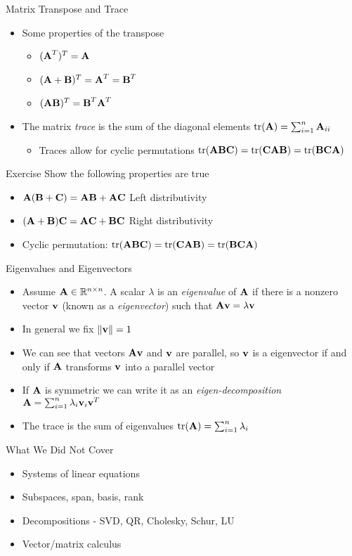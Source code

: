 \documentclass{beamer}
\begin{document}
\begin{frame}{Matrix Transpose and Trace} 
 \begin{itemize} 
  \item Some properties of the transpose  
  \begin{itemize}
  \item $(\textbf{A}^T)^T = \textbf{A}$ 
  \item $(\textbf{A} + \textbf{B})^T = \textbf{A}^T = \textbf{B}^T$ 
  \item $(\textbf{A}\textbf{B})^T = \textbf{B}^T\textbf{A}^T$  
  \end{itemize} 
 \item The matrix \emph{trace} is the sum of the diagonal elements $\mbox{tr}(\textbf{A}) = \sum_{i=1}^n \textbf{A}_{ii}$ 
 \begin{itemize} 
 \item Traces allow for cyclic permutations $\mbox{tr}(\textbf{A}\textbf{B}\textbf{C}) = \mbox{tr}(\textbf{C}\textbf{A}\textbf{B}) = \mbox{tr}(\textbf{B}\textbf{C}\textbf{A})$ 
 \end{itemize}
 \end{itemize}
\end{frame}

\begin{frame}{Exercise} 
Show the following properties are true
\begin{itemize}
 \item $\textbf{A}(\textbf{B} + \textbf{C}) = \textbf{A}\textbf{B} + \textbf{A}\textbf{C}$ Left distributivity 
 \item $(\textbf{A} +\textbf{B}) \textbf{C} = \textbf{A}\textbf{C} +\textbf{B}\textbf{C}$ Right distributivity 
 \item Cyclic permutation: $\mbox{tr}(\textbf{A}\textbf{B}\textbf{C}) = \mbox{tr}(\textbf{C}\textbf{A}\textbf{B}) = \mbox{tr}(\textbf{B}\textbf{C}\textbf{A})$ 
\end{itemize}
\end{frame}

\begin{frame}{Eigenvalues and Eigenvectors}  
\begin{itemize} 
 \item Assume $\textbf{A} \in \mathbb{R}^{n \times n}$. A scalar $\lambda$ is an \emph{eigenvalue} of $\textbf{A}$ if there is a nonzero vector $\textbf{v}$ (known as a \emph{eigenvector}) such that $\textbf{A}\textbf{v} = \lambda\textbf{v}$
 \item In general we fix $\|\textbf{v}\| = 1$ 
 \item We can see that vectors $\textbf{A}\textbf{v}$ and $\textbf{v}$ are parallel, so $\textbf{v}$ is a eigenvector if and only if $\textbf{A}$ transforms $\textbf{v}$ into a parallel vector  
 \item If $\textbf{A}$ is symmetric we can write it as an \emph{eigen-decomposition} $\textbf{A} = \sum_{i=1}^n \lambda_i\textbf{v}_i\textbf{v}^T$ 
 \item The trace is the sum of eigenvalues $\mbox{tr}(\textbf{A}) = \sum_{i=1}^n \lambda_i$
\end{itemize}
\end{frame}

\begin{frame}{What We Did Not Cover}  
\begin{itemize} 
 \item Systems of linear equations 
 \item Subspaces, span, basis, rank 
 \item Decompositions - SVD, QR, Cholesky, Schur, LU 
 \item Vector/matrix calculus 
\end{itemize}
\end{frame}
\end{document}
